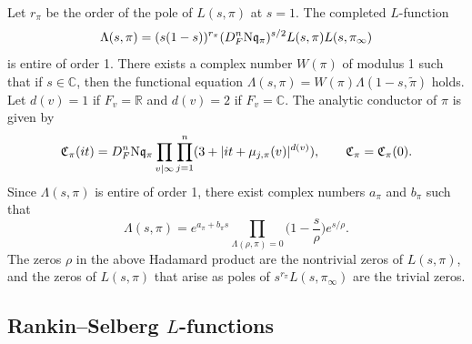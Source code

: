 \documentclass[11pt]{amsart}
\theoremstyle{remark}
\numberwithin{equation}{section}
\newcommand{\kq}{\mathfrak{q}}
\newcommand{\N}{\textnormal{N}}
\newcommand{\R}{\mathbb{R}}
\begin{document}
Let $r_{\pi}$ be the order of the pole of $L(s,\pi)$ at $s=1$.  The completed $L$-function
\[
\Lambda(s,\pi) = (s(1-s))^{r_{\pi}}(D_F^n \N\kq_{\pi})^{s/2}L(s,\pi)L(s,\pi_{\infty})
\]
is entire of order 1.  There exists a complex number $W(\pi)$ of modulus 1 such that if $s\in\mathbb{C}$, then the functional equation $\Lambda(s,\pi)=W(\pi)\Lambda(1-s,\widetilde{\pi})$ holds.  Let $d(v)=1$ if $F_{v}=\R$ and $d(v)=2$ if $F_{v}=\mathbb{C}$.  The analytic conductor of $\pi$ \cite{IS} is given by
\begin{equation}
\label{eqn:analytic_conductor_def}
\mathfrak{C}_{\pi}(it)= D_F^n \N\kq_{\pi}\prod_{v|\infty}\prod_{j=1}^n(3+|it+\mu_{j,\pi}(v)|^{d(v)}),\qquad \mathfrak{C}_{\pi}= \mathfrak{C}_{\pi}(0).
\end{equation}
Since $\Lambda(s,\pi)$ is entire of order 1, there exist complex numbers $a_{\pi}$ and $b_{\pi}$ such that
\[
\Lambda(s,\pi)=e^{a_{\pi}+b_{\pi}s}\prod_{\Lambda(\rho,\pi)=0}\Big(1-\frac{s}{\rho}\Big)e^{s/\rho}.
\]
The zeros $\rho$ in the above Hadamard product are the nontrivial zeros of $L(s,\pi)$, and the zeros of $L(s,\pi)$ that arise as poles of $s^{r_{\pi}}L(s,\pi_{\infty})$ are the trivial zeros.

\subsection{Rankin--Selberg \texorpdfstring{$L$}{L}-functions}
\label{subsec:RS}
\end{document}
